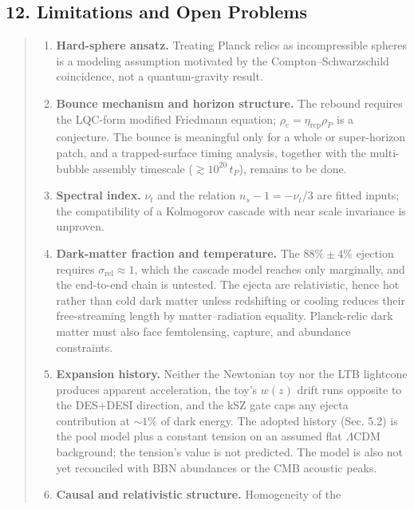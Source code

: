 \documentclass[
]{article}
\providecommand{\tightlist}{%
  \setlength{\itemsep}{0pt}\setlength{\parskip}{0pt}}
\begin{document}
\hypertarget{limitations-and-open-problems}{%
\subsection{\texorpdfstring{\textbf{12. Limitations and Open
Problems}}{12. Limitations and Open Problems}}\label{limitations-and-open-problems}}

\begin{quote}
\begin{enumerate}
\def\labelenumi{\arabic{enumi}.}
\tightlist
\item
  \textbf{Hard-sphere ansatz.} Treating Planck relics as incompressible
  spheres is a modeling assumption motivated by the
  Compton--Schwarzschild coincidence, not a quantum-gravity result.
\item
  \textbf{Bounce mechanism and horizon structure.} The rebound requires
  the LQC-form modified Friedmann equation;
  \(\rho_c = \eta_{\text{rcp}}\rho_P\) is a conjecture. The bounce is
  meaningful only for a whole or super-horizon patch, and a
  trapped-surface timing analysis, together with the multi-bubble
  assembly timescale (\(\gtrsim 10^{20}\,t_P\)), remains to be done.
\item
  \textbf{Spectral index.} \(\nu_t\) and the relation
  \(n_s - 1 = -\nu_t/3\) are fitted inputs; the compatibility of a
  Kolmogorov cascade with near scale invariance is unproven.
\item
  \textbf{Dark-matter fraction and temperature.} The \(88\% \pm 4\%\)
  ejection requires \(\sigma_{\text{rel}} \approx 1\), which the cascade
  model reaches only marginally, and the end-to-end chain is untested.
  The ejecta are relativistic, hence hot rather than cold dark matter
  unless redshifting or cooling reduces their free-streaming length by
  matter--radiation equality. Planck-relic dark matter must also face
  femtolensing, capture, and abundance constraints.
\item
  \textbf{Expansion history.} Neither the Newtonian toy nor the LTB
  lightcone produces apparent acceleration, the toy's \(w(z)\) drift
  runs opposite to the DES+DESI direction, and the kSZ gate caps any
  ejecta contribution at \(\sim\!1\%\) of dark energy. The adopted
  history (Sec. 5.2) is the pool model plus a constant tension on an
  assumed flat \(\Lambda\)CDM background; the tension's value is not
  predicted. The model is also not yet reconciled with BBN abundances or
  the CMB acoustic peaks.
\item
  \textbf{Causal and relativistic structure.} Homogeneity of the

\end{enumerate}
\end{quote}
\end{document}
